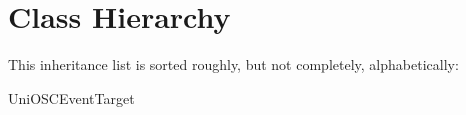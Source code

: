 \section{Class Hierarchy}
This inheritance list is sorted roughly, but not completely, alphabetically\+:\begin{DoxyCompactList}
\item Uni\+O\+S\+C\+Event\+Target\begin{DoxyCompactList}
\item {}
\end{DoxyCompactList}
\end{DoxyCompactList}
